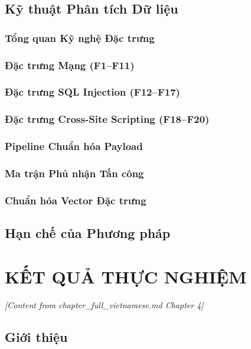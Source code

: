 \documentclass[12pt,a4paper,twoside]{report}
\begin{document}
\section{Kỹ thuật Phân tích Dữ liệu}

\subsection{Tổng quan Kỹ nghệ Đặc trưng}

\subsection{Đặc trưng Mạng (F1--F11)}

\subsection{Đặc trưng SQL Injection (F12--F17)}

\subsection{Đặc trưng Cross-Site Scripting (F18--F20)}

\subsection{Pipeline Chuẩn hóa Payload}

\subsection{Ma trận Phủ nhận Tấn công}

\subsection{Chuẩn hóa Vector Đặc trưng}

\section{Hạn chế của Phương pháp}

\chapter{KẾT QUẢ THỰC NGHIỆM}

\textit{[Content from chapter\_full\_vietnamese.md Chapter 4]}

\section{Giới thiệu}
\end{document}
